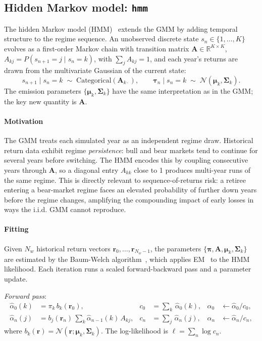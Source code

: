 \documentclass[fleqn,12pt]{report}
\begin{document}
\subsection{Hidden Markov model: \texttt{hmm}}

The hidden Markov model (HMM)~\cite{rabiner1989} extends the GMM by adding
temporal structure to the regime sequence.
An unobserved discrete state $s_n \in \{1,\ldots,K\}$ evolves as a
first-order Markov chain with transition matrix
$\bm{A} \in \mathbb{R}^{K \times K}$,
$A_{kj} = P(s_{n+1} = j \mid s_n = k)$, with $\sum_j A_{kj} = 1$,
and each year's returns are drawn from the multivariate Gaussian of the
current state:
\begin{equation}
    s_{n+1} \mid s_n = k \;\sim\; \mathrm{Categorical}(\bm{A}_{k\cdot}),
    \qquad
    \bm{\tau}_n \mid s_n = k \;\sim\; \mathcal{N}(\bm{\mu}_k, \bm{\Sigma}_k).
    \label{Eq:HMM}
\end{equation}
The emission parameters $\{\bm{\mu}_k, \bm{\Sigma}_k\}$ have the same
interpretation as in the GMM; the key new quantity is $\bm{A}$.

\paragraph*{Motivation}
The GMM treats each simulated year as an independent regime draw.
Historical return data exhibit regime \emph{persistence}: bull and
bear markets tend to continue for several years before switching.
The HMM encodes this by coupling consecutive years through $\bm{A}$,
so a diagonal entry $A_{kk}$ close to 1 produces multi-year runs of
the same regime.
This is directly relevant to sequence-of-returns risk: a retiree entering a
bear-market regime faces an elevated probability of further down years before
the regime changes, amplifying the compounding impact of early losses in ways
the i.i.d. GMM cannot reproduce.

\paragraph*{Fitting}
Given $N_w$ historical return vectors $\bm{r}_0,\ldots,\bm{r}_{N_w-1}$, the
parameters $\{\bm{\pi}, \bm{A}, \bm{\mu}_k, \bm{\Sigma}_k\}$ are estimated
by the Baum-Welch algorithm~\cite{baum1970}, which applies
EM~\cite{dempster1977} to the HMM likelihood.
Each iteration runs a scaled forward-backward pass and a parameter update.

\textit{Forward pass}:
\begin{align}
    \hat{\alpha}_0(k) &= \pi_k\,b_k(\bm{r}_0), &
    c_0 &= {\textstyle\sum_k}\,\hat{\alpha}_0(k), &
    \hat{\alpha}_0 &\leftarrow \hat{\alpha}_0/c_0, \\
    \hat{\alpha}_n(j) &= b_j(\bm{r}_n)\,{\textstyle\sum_k}\hat{\alpha}_{n-1}(k)\,A_{kj}, &
    c_n &= {\textstyle\sum_j}\,\hat{\alpha}_n(j), &
    \hat{\alpha}_n &\leftarrow \hat{\alpha}_n/c_n,
\end{align}
where $b_k(\bm{r}) = \mathcal{N}(\bm{r};\bm{\mu}_k,\bm{\Sigma}_k)$.
The log-likelihood is $\ell = \sum_{n}\log c_n$.
\end{document}
